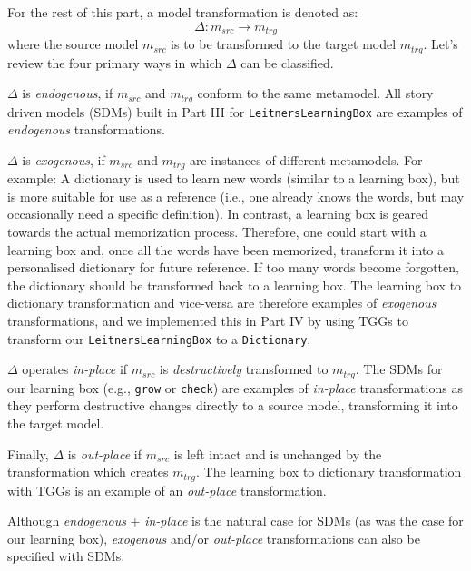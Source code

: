 For the rest of this part, a model transformation is denoted as:
\begin{displaymath}
 	\Delta: m_{src} \rightarrow m_{trg}
\end{displaymath}
where the source model $m_{src}$ is to be transformed to the target model $m_{trg}$. Let's review the four primary ways in which $\Delta$ can be classified.

$\Delta$ is \emph{endogenous}, if $m_{src}$ and $m_{trg}$ conform to the same metamodel. All story driven models (SDMs) built in Part III for
\texttt{LeitnersLearningBox} are examples of \emph{endogenous} transformations.

$\Delta$ is \emph{exogenous}, if $m_{src}$ and $m_{trg}$ are instances of different metamodels. For example: A dictionary is used to learn new
words (similar to a learning box), but is more suitable for use as a reference (i.e., one already knows the words, but may occasionally need a specific
definition). In contrast, a learning box is geared towards the actual memorization process. Therefore, one could start with a learning box and, once all the
words have been memorized, transform it into a personalised dictionary for future reference. If too many words become forgotten, the dictionary should be
transformed back to a learning box. The learning box to dictionary transformation and vice-versa are therefore examples of \emph{exogenous} transformations, and
we implemented this in Part IV by using TGGs to transform our \texttt{LeitnersLearningBox} to a \texttt{Dictionary}.

$\Delta$ operates \emph{in-place} if $m_{src}$ is \emph{destructively} transformed to $m_{trg}$. The SDMs for our learning box (e.g.,
\texttt{grow} or \texttt{check}) are examples of \emph{in-place} transformations as they perform destructive changes directly to a source model, transforming it
into the target model.

Finally, $\Delta$ is \emph{out-place} if $m_{src}$ is left intact and is unchanged by the transformation which creates $m_{trg}$. The
learning box to dictionary transformation with TGGs is an example of an \emph{out-place} transformation.

Although \emph{endogenous} + \emph{in-place} is the natural case for SDMs (as was the case for our learning box), \emph{exogenous} and/or \emph{out-place}
transformations can also be specified with SDMs. 
 
\newpage
 
